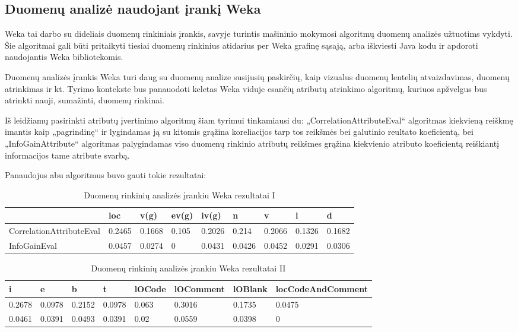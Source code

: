 \documentclass{VUMIFPSbakalaurinis}
\begin{document}
\subsection{Duomenų analizė naudojant įrankį Weka}

Weka tai darbo su dideliais duomenų rinkiniais įrankis, savyje turintis mašininio mokymosi algoritmų duomenų analizės užtuotims vykdyti. Šie algoritmai gali būti pritaikyti tiesiai duomenų rinkinius atidarius per Weka grafinę sąsają, arba iškviesti Java kodu ir apdoroti naudojantis Weka bibliotekomis.

Duomenų analizės įrankis Weka \cite{hall09:_weka_data_minin_softw} turi daug su duomenų analize susijusių paskirčių, kaip vizualus duomenų lentelių atvaizdavimas, duomenų atrinkimas ir kt. Tyrimo kontekste bus panauodoti keletas Weka viduje esančių atributų atrinkimo algoritmų, kuriuos apžvelgus bus atrinkti nauji, sumažinti, duomenų rinkinai.

Iš leidžiamų pasirinkti atributų įvertinimo algoritmų šiam tyrimui tinkamiausi du: „CorrelationAttributeEval“ algoritmas kiekvieną reiškmę imantis kaip „pagrindinę“ ir lygindamas ją su kitomis grąžina koreliacijos tarp tos reikšmės bei galutinio reultato koeficientą, bei „InfoGainAttribute“ algoritmas palygindamas viso duomenų rinkinio atributų reikšmes grąžina kiekvienio atributo koeficientą reiškiantį informacijos tame atribute svarbą.

Panaudojus abu algoritmus buvo gauti tokie rezultatai:

\begin{table}[H]
\centering
\caption{Duomenų rinkinių analizės įrankiu Weka rezultatai I}
\label{tab:weka_1}
\begin{tabular}{lllllllll}
\hline
\multicolumn{1}{|l}{}                         & loc    & v(g)   & ev(g) & iv(g)  & n      & v      & l      & \multicolumn{1}{l|}{d}      \\ \hline
\multicolumn{1}{|l}{CorrelationAttributeEval} & 0.2465 & 0.1668 & 0.105 & 0.2026 & 0.214  & 0.2066 & 0.1326 & \multicolumn{1}{l|}{0.1682} \\
\multicolumn{1}{|l}{InfoGainEval}             & 0.0457 & 0.0274 & 0     & 0.0431 & 0.0426 & 0.0452 & 0.0291 & \multicolumn{1}{l|}{0.0306} \\ \hline                     
\end{tabular}
\end{table}

\begin{table}[H]
\centering
\caption{Duomenų rinkinių analizės įrankiu Weka rezultatai II}
\label{tab:weka_2}
\begin{tabular}{|llllllll|}
\hline
i & e & b & t & lOCode & lOComment & lOBlank & locCodeAndComment \\ \hline
0.2678 & 0.0978 & 0.2152 & 0.0978 & 0.063 & 0.3016 & 0.1735 & 0.0475 \\
0.0461 & 0.0391 & 0.0493 & 0.0391 & 0.02 & 0.0559 & 0.0398 & 0 \\ \hline
\end{tabular}
\end{table}
\end{document}
